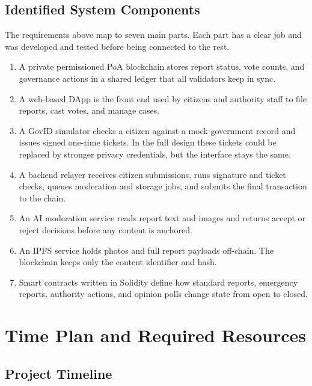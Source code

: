\subsection{Identified System Components}

The requirements above map to seven main parts. Each part has a clear job and was developed and tested before being connected to the rest.

\begin{enumerate}
    \item A private permissioned \ac{PoA} blockchain stores report status, vote counts, and governance actions in a shared ledger that all validators keep in sync.

    \item A web-based \ac{DApp} is the front end used by citizens and authority staff to file reports, cast votes, and manage cases.

    \item A GovID simulator checks a citizen against a mock government record and issues signed one-time tickets. In the full design these tickets could be replaced by stronger privacy credentials, but the interface stays the same.

    \item A backend relayer receives citizen submissions, runs signature and ticket checks, queues moderation and storage jobs, and submits the final transaction to the chain.

    \item An \ac{AI} moderation service reads report text and images and returns accept or reject decisions before any content is anchored.

    \item An \ac{IPFS} service holds photos and full report payloads off-chain. The blockchain keeps only the content identifier and hash.

    \item Smart contracts written in Solidity define how standard reports, emergency reports, authority actions, and opinion polls change state from open to closed.

 
\end{enumerate}


\section{Time Plan and Required Resources}


\subsection{Project Timeline}


